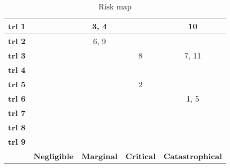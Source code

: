 \begin{table}[H]
	\centering
	\caption{Risk map}
	\label{tab:riskmap}
	\begin{tabular}{|c|c|c|c|c|} %
		\hline
		\textbf{\gls{trl} 1} & \cellcolor{green!70} & \cellcolor{yellow!75} 3, 4 & \cellcolor{red!60} & \cellcolor{red!60} 10 \\ \hline
		\textbf{\gls{trl} 2} & \cellcolor{green!70} & \cellcolor{yellow!75} 6, 9 & \cellcolor{red!60} & \cellcolor{red!60} \\ \hline
		\textbf{\gls{trl} 3} & \cellcolor{green!70} & \cellcolor{yellow!75} & \cellcolor{red!60} 8 & \cellcolor{red!60} 7, 11 \\ \hline
		\textbf{\gls{trl} 4} & \cellcolor{green!70} & \cellcolor{yellow!75} & \cellcolor{yellow!75} & \cellcolor{yellow!75} \\ \hline
		\textbf{\gls{trl} 5} & \cellcolor{green!70} & \cellcolor{green!70} & \cellcolor{yellow!75} 2 & \cellcolor{yellow!75} \\ \hline
		\textbf{\gls{trl} 6} & \cellcolor{green!70} & \cellcolor{green!70} & \cellcolor{green!70} & \cellcolor{green!70} 1, 5 \\ \hline
		\textbf{\gls{trl} 7} & \cellcolor{green!70} & \cellcolor{green!70} & \cellcolor{green!70} & \cellcolor{green!70} \\ \hline
		\textbf{\gls{trl} 8} & \cellcolor{green!70} & \cellcolor{green!70} & \cellcolor{green!70} & \cellcolor{green!70} \\ \hline
		\textbf{\gls{trl} 9} & \cellcolor{green!70} & \cellcolor{green!70} & \cellcolor{green!70} & \cellcolor{green!70} \\ \hline
		 & \textbf{Negligible} & \textbf{Marginal} & \textbf{Critical} & \textbf{Catastrophical} \\ \hline
	\end{tabular}
\end{table}




